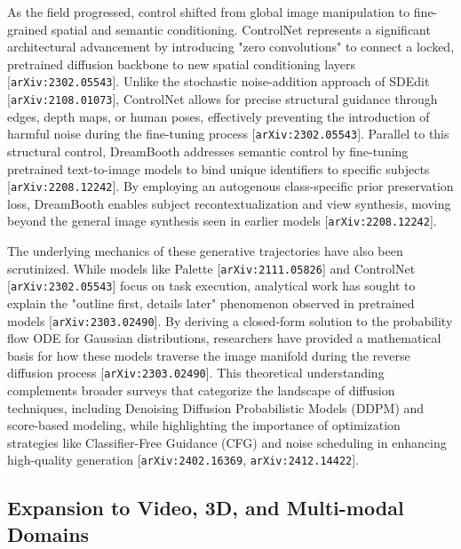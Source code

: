 \documentclass[11pt]{article}
\begin{document}
As the field progressed, control shifted from global image manipulation to fine-grained spatial and semantic conditioning. ControlNet represents a significant architectural advancement by introducing "zero convolutions" to connect a locked, pretrained diffusion backbone to new spatial conditioning layers [\texttt{arXiv:2302.05543}]. Unlike the stochastic noise-addition approach of SDEdit [\texttt{arXiv:2108.01073}], ControlNet allows for precise structural guidance through edges, depth maps, or human poses, effectively preventing the introduction of harmful noise during the fine-tuning process [\texttt{arXiv:2302.05543}]. Parallel to this structural control, DreamBooth addresses semantic control by fine-tuning pretrained text-to-image models to bind unique identifiers to specific subjects [\texttt{arXiv:2208.12242}]. By employing an autogenous class-specific prior preservation loss, DreamBooth enables subject recontextualization and view synthesis, moving beyond the general image synthesis seen in earlier models [\texttt{arXiv:2208.12242}].

The underlying mechanics of these generative trajectories have also been scrutinized. While models like Palette [\texttt{arXiv:2111.05826}] and ControlNet [\texttt{arXiv:2302.05543}] focus on task execution, analytical work has sought to explain the "outline first, details later" phenomenon observed in pretrained models [\texttt{arXiv:2303.02490}]. By deriving a closed-form solution to the probability flow ODE for Gaussian distributions, researchers have provided a mathematical basis for how these models traverse the image manifold during the reverse diffusion process [\texttt{arXiv:2303.02490}]. This theoretical understanding complements broader surveys that categorize the landscape of diffusion techniques, including Denoising Diffusion Probabilistic Models (DDPM) and score-based modeling, while highlighting the importance of optimization strategies like Classifier-Free Guidance (CFG) and noise scheduling in enhancing high-quality generation [\texttt{arXiv:2402.16369}, \texttt{arXiv:2412.14422}].

\subsection{Expansion to Video, 3D, and Multi-modal Domains}
\end{document}
